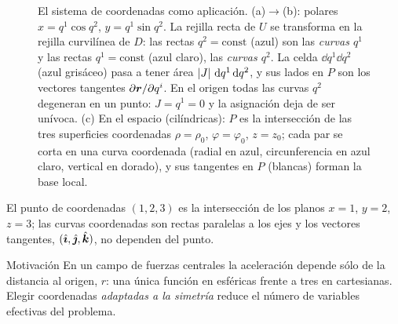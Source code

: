 \begin{figure}[ht]
\begin{tikzpicture}[tdplot_main_coords,scale=1.3]
\end{tikzpicture}
\caption{El sistema de coordenadas como aplicación. (a)$\to$(b): polares
$x=q^{1}\cos q^{2}$, $y=q^{1}\sin q^{2}$. La rejilla recta de $U$ se
transforma en la rejilla curvilínea de $D$: las rectas $q^{2}=\text{const}$
(azul) son las \emph{curvas $q^{1}$} y las rectas $q^{1}=\text{const}$
(azul claro), las \emph{curvas $q^{2}$}. La celda $\dd q^{1}\dd q^{2}$ (azul grisáceo)
pasa a tener área $\left\lvert J\right\rvert\,\mathop{}\!\mathrm{d} q^{1}\mathop{}\!\mathrm{d} q^{2}$, y sus lados en $P$ son los
vectores tangentes $\partial\bm{r}/\partial q^{i}$. En el origen todas las
curvas $q^{2}$ degeneran en un punto: $J=q^{1}=0$ y la asignación deja de ser
unívoca. (c) En el espacio (cilíndricas): $P$ es la intersección de las tres
superficies coordenadas $\rho=\rho_{0}$, $\varphi=\varphi_{0}$, $z=z_{0}$; cada
par se corta en una curva coordenada (radial en azul, circunferencia en azul claro,
vertical en dorado), y sus tangentes en $P$ (blancas) forman la base local.}
\label{fig:def-coordenadas}
\end{figure}

\begin{ejemplo}[Cartesianas]
El punto de coordenadas $(1,2,3)$ es la intersección de los planos $x=1$,
$y=2$, $z=3$; las curvas coordenadas son rectas paralelas a los ejes y los
vectores tangentes, $(\hat{\bm{\imath}},\hat{\bm{\jmath}},\hat{\bm{k}})$, no dependen del punto.
\end{ejemplo}

\begin{clave}{Motivación}
En un campo de fuerzas centrales la aceleración depende sólo de la distancia
al origen, $r$: una única función en esféricas frente a tres en
cartesianas. Elegir coordenadas \emph{adaptadas a la simetría} reduce el
número de variables efectivas del problema.
\end{clave}

